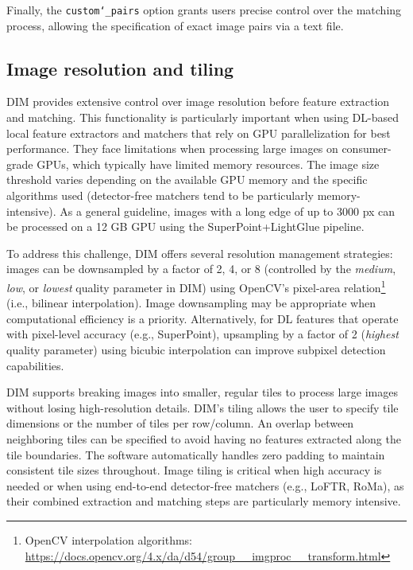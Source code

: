 Finally, the \texttt{custom\char`_pairs} option grants users precise control over the matching process, allowing the specification of exact image pairs via a text file. 

\subsection{Image resolution and tiling}\label{sec:5:tiling}

DIM provides extensive control over image resolution before feature extraction and matching. 
This functionality is particularly important when using DL-based local feature extractors and matchers that rely on GPU parallelization for best performance. 
They face limitations when processing large images on consumer-grade GPUs, which typically have limited memory resources. 
The image size threshold varies depending on the available GPU memory and the specific algorithms used (detector-free matchers tend to be particularly memory-intensive). 
As a general guideline, images with a long edge of up to 3000 px can be processed on a 12 GB GPU using the SuperPoint+LightGlue pipeline. 

To address this challenge, DIM offers several resolution management strategies: images can be downsampled by a factor of 2, 4, or 8 (controlled by the \textit{medium}, \textit{low}, or \textit{lowest} quality parameter in DIM) using OpenCV's pixel-area relation\footnote{OpenCV interpolation algorithms: \url{https://docs.opencv.org/4.x/da/d54/group__imgproc__transform.html}} (i.e., bilinear interpolation). 
Image downsampling may be appropriate when computational efficiency is a priority. Alternatively, for DL features that operate with pixel-level accuracy (e.g., SuperPoint), upsampling by a factor of 2 (\textit{highest} quality parameter) using bicubic interpolation can improve subpixel detection capabilities.  

DIM supports breaking images into smaller, regular tiles to process large images without losing high-resolution details.
DIM's tiling allows the user to specify tile dimensions or the number of tiles per row/column.
An overlap between neighboring tiles can be specified to avoid having no features extracted along the tile boundaries. 
The software automatically handles zero padding to maintain consistent tile sizes throughout. 
Image tiling is critical when high accuracy is needed or when using end-to-end detector-free matchers (e.g., LoFTR, RoMa), as their combined extraction and matching steps are particularly memory intensive. 

